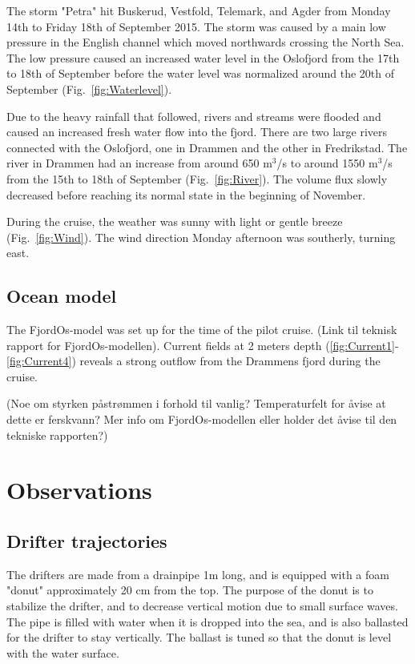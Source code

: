 \documentclass[12pt,a4paper,english]{article}
\begin{document}
The storm "Petra" hit Buskerud, Vestfold, Telemark, and Agder from Monday 14th to Friday 18th of September 2015. The storm was caused by a main low pressure in the English channel which moved northwards crossing the North Sea. The low pressure caused an increased water level in the Oslofjord from the 17th to 18th of September before the water level was normalized around the 20th of September (Fig.~\ref{fig:Waterlevel}).

Due to the heavy rainfall that followed, rivers and streams were flooded and caused an increased fresh water flow into the fjord. There are two large rivers connected with the Oslofjord, one in Drammen and the other in Fredrikstad. The river in Drammen had an increase from around 650 m$^3$/s to around 1550 m$^3$/s from the 15th to 18th of September (Fig.~\ref{fig:River}). The volume flux slowly decreased before reaching its normal state in the beginning of November. 

During the cruise, the weather was sunny with light or gentle breeze (Fig.~\ref{fig:Wind}). The wind direction Monday afternoon was southerly, turning east. 

\subsection{Ocean model}
The FjordOs-model was set up for the time of the pilot cruise. (Link til teknisk rapport for FjordOs-modellen). Current fields at 2 meters depth (\ref{fig:Current1}-\ref{fig:Current4}) reveals a strong outflow from the Drammens fjord during the cruise. 

(Noe om styrken p\aa str\o mmen i forhold til vanlig? Temperaturfelt for \aa vise at dette er ferskvann? Mer info om FjordOs-modellen eller holder det \aa vise til den tekniske rapporten?)


\clearpage

\section{Observations}


\subsection{Drifter trajectories}
The drifters are made from a drainpipe 1m long, and is equipped with a foam "donut" approximately 20 cm from the top. The purpose of the donut is to stabilize the drifter, and to decrease vertical motion due to small surface waves. The pipe is filled with water when it is dropped into the sea, and is also ballasted for the drifter to stay vertically. The ballast is tuned so that the donut is level with the water surface.
\end{document}
